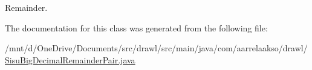 Remainder. 



The documentation for this class was generated from the following file\+:\begin{DoxyCompactItemize}
\item 
/mnt/d/\+One\+Drive/\+Documents/src/drawl/src/main/java/com/aarrelaakso/drawl/\hyperlink{_sisu_big_decimal_remainder_pair_8java}{Sisu\+Big\+Decimal\+Remainder\+Pair.\+java}\end{DoxyCompactItemize}
